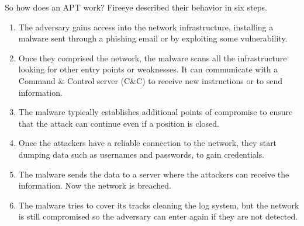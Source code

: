So how does an APT work? Fireeye described their behavior in six steps. \cite{fireeye_anatomy}


\begin{enumerate}
	\item The adversary gains access into the network infrastructure, installing a malware sent through a phishing email or by exploiting some vulnerability.
	\item Once they comprised the network, the malware scans all the infrastructure looking for other entry points or weaknesses. It can communicate with a Command \& Control server (C\&C) to receive new instructions or to send information.
	\item The malware typically establishes additional points of compromise to ensure that the attack can continue even if a position is closed.
	\item Once the attackers have a reliable connection to the network, they start dumping data such as usernames and passwords, to gain credentials.
	
	\item The malware sends the data to a server where the attackers can receive the information. Now the network is breached.
	
	\item The malware tries to cover its tracks cleaning the log system, but the network is still compromised so the adversary can enter again if they are not detected.
	
\end{enumerate}